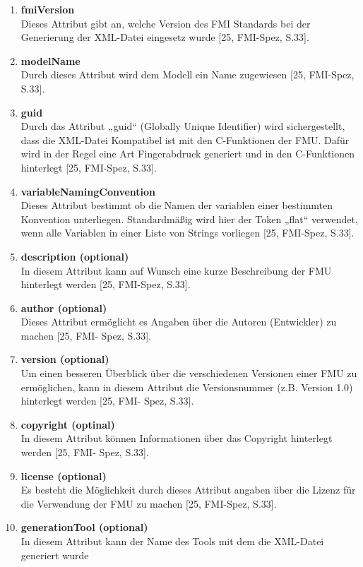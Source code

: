 \begin{enumerate}
	\item \textbf{fmiVersion} \\
	Dieses Attribut gibt an, welche Version des FMI Standards bei der Generierung der XML-Datei
	eingesetz wurde [25, FMI-Spez, S.33].
	\item \textbf{modelName} \\
	Durch dieses Attribut wird dem Modell ein Name zugewiesen [25, FMI-Spez, S.33].
	\item \textbf{guid} \\
	Durch das Attribut „guid“ (Globally Unique Identifier) wird sichergestellt, dass die XML-Datei 
	Kompatibel ist mit den C-Funktionen der FMU. Dafür wird in der Regel eine Art Fingerabdruck
	generiert und in den C-Funktionen hinterlegt [25, FMI-Spez, S.33].
	\item \textbf{variableNamingConvention} \\
	Dieses Attribut bestimmt ob die Namen der variablen einer bestimmten Konvention 
	unterliegen. Standardmäßig wird hier der Token „flat“ verwendet, wenn alle Variablen
	in einer Liste von Strings vorliegen [25, FMI-Spez, S.33].
	\item \textbf{description (optional)} \\
	In diesem Attribut kann auf Wunsch eine kurze Beschreibung der FMU hinterlegt werden [25, 
	FMI-Spez, S.33].
	\item \textbf{author (optional)} \\
	Dieses Attribut ermöglicht es Angaben über die Autoren (Entwickler) zu machen [25, FMI-
	Spez, S.33].
	\item \textbf{version (optional)} \\
	Um einen besseren Überblick über die verschiedenen Versionen einer FMU zu ermöglichen,
	kann in diesem Attribut die Versionsnummer (z.B. Version 1.0) hinterlegt werden [25, FMI-
	Spez, S.33].
	\item \textbf{copyright (optinal)} \\
	In diesem Attribut können Informationen über das Copyright hinterlegt werden [25, FMI-
	Spez, S.33].
	\item \textbf{license (optional)} \\
	Es besteht die Möglichkeit durch dieses Attribut angaben über die Lizenz für die Verwendung
	der FMU zu machen [25, FMI-Spez, S.33].
	\item \textbf{generationTool (optional)} \\
	In diesem Attribut kann der Name des Tools mit dem die XML-Datei generiert wurde

\end{enumerate}
